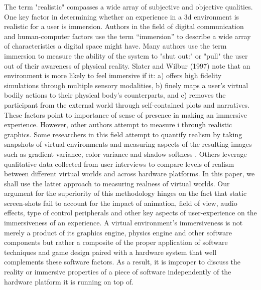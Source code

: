 The term "realistic" compasses a wide array of subjective and objective qualities. One key factor in determining whether an experience in a 3d environment is realistic for a user is immersion. Authors in the field of digital communication and human-computer factors use the term “immersion” to describe a wide array of characteristics a digital space might have. Many authors use the term immersion to measure the ability of the system to "shut out:" or "pull" the user out of their awareness of physical reality. 
Slater and Wilbur (1997) note that an environment is more likely to feel immersive if it:
a) offers high fidelity simulations
through multiple sensory modalities, b) finely maps a user’s virtual bodily
actions to their physical body's counterparts, and c) removes the participant
from the external world through self-contained plots and narratives. 
These factors point to importance of sense of presence in making an immersive experience. However, other authors attempt to measure i through realistic graphics. Some researchers in this field attempt to quantify realism by taking snapshots of virtual environments and measuring aspects of the resulting images such as gradient variance, color variance and shadow
softness \cite{Wang:2011:RRP:2013879.2014089}. Others leverage qualitative data collected from user interviews to compare levels of realism between different virtual worlds and across hardware platforms. In this paper, we shall use the latter approach to measuring realness of virtual worlds. Our argument for the superiority of this methodology hinges on the fact that static screen-shots fail to account for the impact of animation, field of view, audio effects, type of control peripherals and other key aspects of user-experience on the immersiveness of an experience. A virtual environment's immersiveness is not merely a product of its graphics engine, physics engine and other software components but rather a composite of the proper application of software techniques and game design paired with a hardware system that well complements these software factors. As a result, it is improper to discuss the reality or immersive properties of
a piece of software independently of the hardware platform it is running on top of. 

